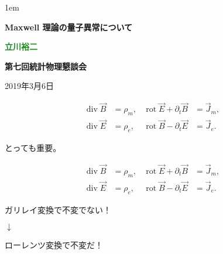 \documentclass[xcolor={svgnames,rgb}]{beamer}
\date[]{}
\def\bff{\ifmmode\else\bfseries\fi}
\def\green#1{\textcolor{ForestGreen}{\bff #1}}
\def\blue#1{\textcolor{myblue}{\bff #1}}
\begin{document}
\parskip1em 
\boldmath
\def\baselinestretch{1.1}



\def\inc#1{\vcenter{\hbox{\texttt{[image: \#1]}}}}
\def\incc#1{\vcenter{\hbox{\texttt{[image: \#1]}}}}

\begin{frame}
\bigskip\bigskip\bigskip\bigskip\bigskip

\vfill


\begin{exampleblock}{}
\begin{center}\LARGE\bfseries
\color{math}
Maxwell 理論の量子異常について
\end{center}
\end{exampleblock}

\bigskip\bigskip\bigskip
\begin{center}
\large  \green{立川裕二}  

\bigskip
\large \blue{第七回統計物理懇談会}

\bigskip
\large 2019年3月6日
\end{center}
\bigskip\bigskip\bigskip
\vfill


\end{frame}



\def\div{\mathop{\mathrm{div}}}
\def\rot{\mathop{\mathrm{rot}}}
\begin{frame}
\begin{align*}
\div \vec B&=\rho_m,  &\rot \vec E + \partial_t \vec B&=\vec J_m, \\
\div \vec E&=\rho_e, & \rot \vec B - \partial_t \vec E&=\vec J_e.
\end{align*}
\begin{center}
とっても重要。
\end{center}

\end{frame}

\begin{frame}
\begin{align*}
\div \vec B&=\rho_m,  &\rot \vec E + \partial_t \vec B&=\vec J_m, \\
\div \vec E&=\rho_e, & \rot \vec B - \partial_t \vec E&=\vec J_e.
\end{align*}

\begin{center}
ガリレイ変換で不変でない！ 

$\downarrow$

ローレンツ変換で不変だ！
\end{center}

\end{frame}
\end{document}

